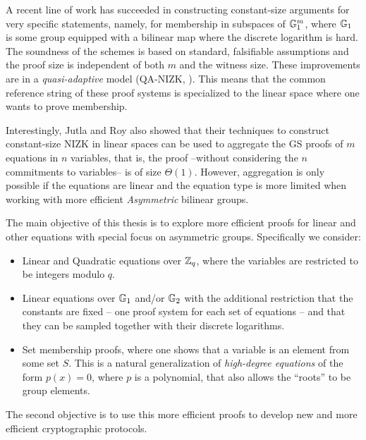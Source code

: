 A recent line of work 
  \cite{AC:JutRoy13,C:JutRoy14,EC:KilWee15,EC:LPJY14} 
has succeeded in constructing constant-size  
  arguments for very specific statements, namely, for membership in subspaces of $\mathbb{G}_1^{m}$, 
  where $\mathbb{G}_1$ is some group equipped with a bilinear map where the discrete logarithm is hard. 
The soundness of the schemes is based on standard, falsifiable assumptions 
  and the proof size is independent of both $m$ and the witness size.  These improvements are in a  \textit{quasi-adaptive} 
  model (QA-NIZK, \cite{AC:JutRoy13}).  This means that the common reference string of these proof systems is 
  specialized to the linear space where one wants to prove membership.
  
Interestingly, Jutla and Roy  \cite{C:JutRoy14} also showed that their techniques to construct 
  constant-size NIZK in linear spaces can be used to aggregate the GS proofs of $m$ equations in $n$ variables, that is, the proof --without considering the $n$ commitments to variables-- is of size $\Theta(1)$. However, aggregation is only possible if the equations are linear and the equation type is more limited when working with more efficient \emph{Asymmetric} bilinear groups. 

The main objective of this thesis is to explore more efficient proofs for linear and other equations with special focus on asymmetric groups. Specifically we consider:
\begin{itemize}
\item Linear and Quadratic equations over $\mathbb{Z}_q$, where the variables are restricted to be integers modulo $q$.
\item Linear equations over $\mathbb{G}_1$ and/or $\mathbb{G}_2$ with the additional restriction that the constants are fixed -- one proof system for each set of equations -- and that they 
can be sampled together with their discrete logarithms.
\item Set membership proofs, where one shows that a variable is an element from some set $S$. This is a natural generalization of \emph{high-degree equations} of the form $p(x)=0$, where $p$ is a polynomial, that also allows the ``roots'' to be group elements.
\end{itemize}
The second objective is to use this more efficient proofs to develop new and more efficient cryptographic protocols.
